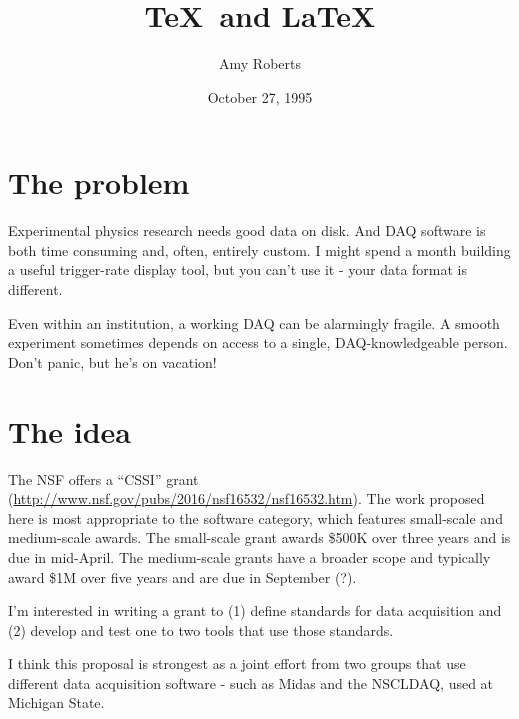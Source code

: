 \documentclass[]{report}   %
\begin{document}
\title{\TeX\ and \LaTeX}   %
\author{Amy Roberts}         %
\date{October 27, 1995}    %


\section*{The problem}     %

Experimental physics research needs good data on disk.  And DAQ software is both time consuming and, often, entirely custom.  I might spend a month building a useful trigger-rate display tool, but you can't use it - your data format is different.  

Even within an institution, a working DAQ can be alarmingly fragile.  A smooth experiment sometimes depends on access to a single, DAQ-knowledgeable person.  Don't panic, but he's on vacation!  


\section*{The idea}     %
The NSF offers a ``CSSI'' grant
(\url{http://www.nsf.gov/pubs/2016/nsf16532/nsf16532.htm}).  The work proposed here is most appropriate to the software category, which features small-scale and medium-scale awards.  The small-scale grant awards \$500K over three years and is due in mid-April.  The medium-scale grants have a broader scope and typically award \$1M over five years and are due in September (?).

I'm interested in writing a grant to (1) define standards for data acquisition and (2) develop and test one to two tools that use those standards.  

I think this proposal is strongest as a joint effort from two groups that use different data acquisition software - such as Midas and the NSCLDAQ, used at Michigan State.
\end{document}
